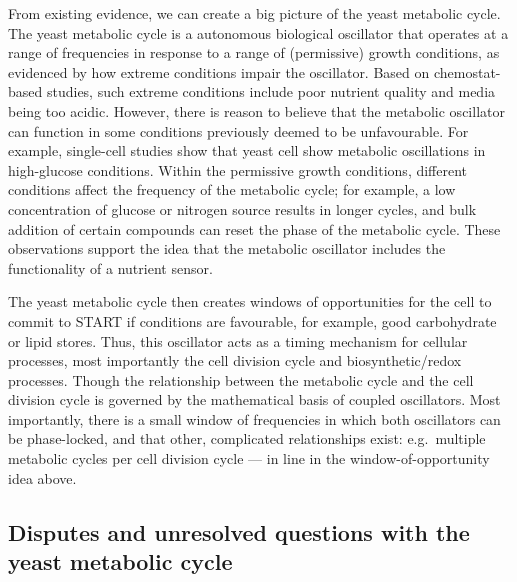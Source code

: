 From existing evidence, we can create a big picture of the yeast metabolic cycle.
The yeast metabolic cycle is a autonomous biological oscillator that operates at a range of frequencies in response to a range of (permissive) growth conditions, as evidenced by how extreme conditions impair the oscillator.
Based on chemostat-based studies, such extreme conditions include poor nutrient quality and media being too acidic.
However, there is reason to believe that the metabolic oscillator can function in some conditions previously deemed to be unfavourable.
For example, single-cell studies show that yeast cell show metabolic oscillations in high-glucose conditions.
Within the permissive growth conditions, different conditions affect the frequency of the metabolic cycle;
for example, a low concentration of glucose or nitrogen source results in longer cycles, and bulk addition of certain compounds can reset the phase of the metabolic cycle.
These observations support the idea that the metabolic oscillator includes the functionality of a nutrient sensor.

The yeast metabolic cycle then creates windows of opportunities for the cell to commit to START if conditions are favourable, for example, good carbohydrate or lipid stores.
Thus, this oscillator acts as a timing mechanism for cellular processes, most importantly the cell division cycle and biosynthetic/redox processes.
Though the relationship between the metabolic cycle and the cell division cycle is governed by the mathematical basis of coupled oscillators.
Most importantly, there is a small window of frequencies in which both oscillators can be phase-locked, and that other, complicated relationships exist: e.g.\ multiple metabolic cycles per cell division cycle --- in line in the window-of-opportunity idea above.


\subsection{Disputes and unresolved questions with the yeast metabolic cycle}
\label{subsec:intro-ymc-unresolved}

